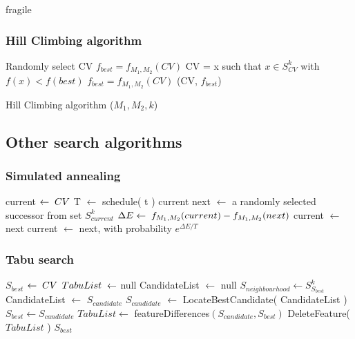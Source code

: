\documentclass{beamer}
\begin{document}
\begin{frame}{fragile}
\frametitle{Hill Climbing algorithm}
\begin{algorithm}[H]
  \begin{algorithmic}[1]
    \State Randomly select CV
    \State $f_{best} = f_{M_{1}, M_{2}}(CV)$
    \State CV = x such that $x \in S^{k}_{CV}$ with $f(x) < f(best)$
    \State $f_{best} = f_{M_{1}, M_{2}}(CV)$
    \EndWhile
    \State \Return (CV, $f_{best}$)
  \end{algorithmic}
  \caption{Hill Climbing algorithm ($M_{1}, M_{2}, k$)}
\end{algorithm}
\end{frame}

\subsection{Other search algorithms}

\begin{frame}[allowframebreaks]
\frametitle{Simulated annealing}
  \begin{algorithmic}[1]
      \State current $\gets \thickspace CV$
        \State T $\gets$ schedule( t )
          \State \Return current
        \EndIf
        \State next $\gets$ a randomly selected successor from set $S^{k}_{current}$
        \State $\Delta E \gets  \thickspace f_{M_{1}, M_{2}}(current) - f_{M_{1}, M_{2}}(next)$
          \State current $\gets$ next
        \Else
          \State current $\gets$ next, with probability $e^{\Delta E / T}$
        \EndIf
      \EndFor
    \EndFunction
  \end{algorithmic}
\end{frame}

\begin{frame}[allowframebreaks]
\frametitle{Tabu search}
  \begin{algorithmic}[1]
      \State $S_{best}$ $\gets \thickspace CV$
      \State $TabuList \thickspace \gets$ null
        \State CandidateList $\gets$ null
        \State $S_{neighbourhood} \gets S^{k}_{S_{best}}$
            \State CandidateList $\gets$ $S_{candidate}$
          \EndIf
        \EndFor
        \State $S_{candidate}$ $\gets$ LocateBestCandidate( CandidateList )
          \State $S_{best} \gets S_{candidate}$
          \State $TabuList \gets$ featureDifferences$(S_{candidate}, S_{best})$
            \State DeleteFeature( $TabuList$ )
          \EndWhile
        \EndIf
      \EndWhile 
      \State \Return $S_{best}$
    \EndFunction
  \end{algorithmic}
\end{frame}
\end{document}
